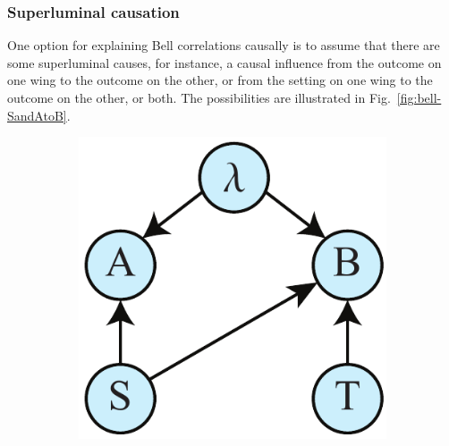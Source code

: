 \documentclass[letterpaper,onecolumn,nofootinbib]{revtex4}
\begin{document}
\subsubsection{Superluminal causation}

One option for explaining Bell correlations causally is to assume that there are some superluminal causes, for instance, a causal influence from the outcome on one wing to the outcome on
the other, or from the setting on one wing to the outcome on the other, or both. 
  The possibilities are illustrated in Fig.~\ref{fig:bell-SandAtoB}.
\begin{figure}[h]
        \begin{subfigure}[b]{0.18\textwidth}
                	\centering
        	\includegraphics[width=\textwidth]{bell-superlum-1}
		\subcaption{}
		\label{fig:bell-StoB}
	\end{subfigure}
	\hspace{5em}
        \begin{subfigure}[b]{0.18\textwidth}
                	\centering

\end{subfigure}
\end{figure}
\end{document}
